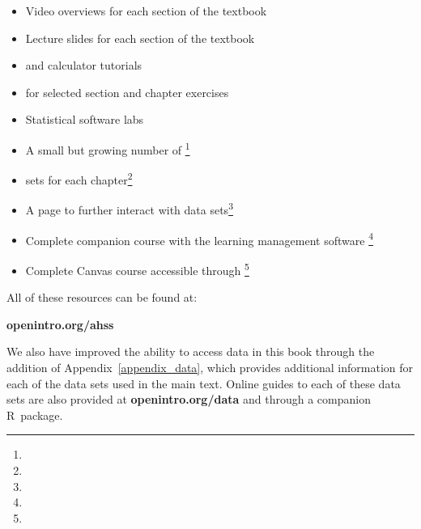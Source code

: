 \begin{itemize}
\setlength{\itemsep}{0mm}
\item Video overviews for each section of the textbook
\item Lecture slides for each section of the textbook
\item {} and  calculator tutorials
\item {} for selected section and chapter exercises
\item Statistical software labs
\item A small but growing number of \footnote{}
\item {} sets for each chapter\footnote{}
\item A  page to further interact with data sets\footnote{}
\item Complete companion course with the learning management software \footnote{}
\item Complete Canvas course accessible through \footnote{}
\end{itemize}

\noindent%
All of these resources can be found at: 
\begin{center}
    {\color{black}\textbf{openintro.org/ahss}}
\end{center}

\noindent%
We also have improved the ability to access data in this book
through the addition of Appendix~\ref{appendix_data},
which provides additional information for each of the data sets
used in the main text.
Online guides to each of these data sets are also provided at
    {\color{black}\textbf{openintro.org/data}}
and through a
    {companion R~package}.

